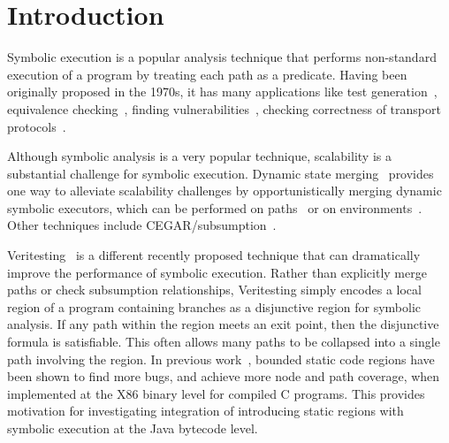 \section{Introduction}
Symbolic execution is a popular analysis technique that performs non-standard execution of a program by treating each path as a predicate.
%
Having been originally proposed in the 1970s, it has many applications
like test generation~\cite{dart,cute}, equivalence checking~\cite{ramos,adaptorsynth}, finding vulnerabilities~\cite{driller,angr}, checking correctness of transport protocols~\cite{transport}. 

Although symbolic analysis is a very popular technique, scalability is a substantial challenge for symbolic execution.
%
Dynamic state merging~\cite{kuznetsov} provides one way to
alleviate scalability challenges by opportunistically merging dynamic
symbolic executors, which can be performed on paths~ or on environments~.  
Other techniques include CEGAR/subsumption~.
 
%
Veritesting~\cite{veritesting} is a different recently proposed technique that can dramatically improve the performance of symbolic execution.  Rather than explicitly merge paths or check subsumption relationships, Veritesting simply encodes a local region of a program containing branches as a disjunctive region for symbolic analysis.  If any path within the region meets an exit point, then the disjunctive formula is satisfiable.  This often allows many paths to be collapsed into a single path involving the region.  
%
In previous work~\cite{veritesting}, bounded static code regions have been shown to find more bugs, and achieve more node and path coverage, when implemented at the X86 binary level for compiled C programs.
%
This provides motivation for investigating integration of introducing static regions with symbolic execution at the Java bytecode level.

